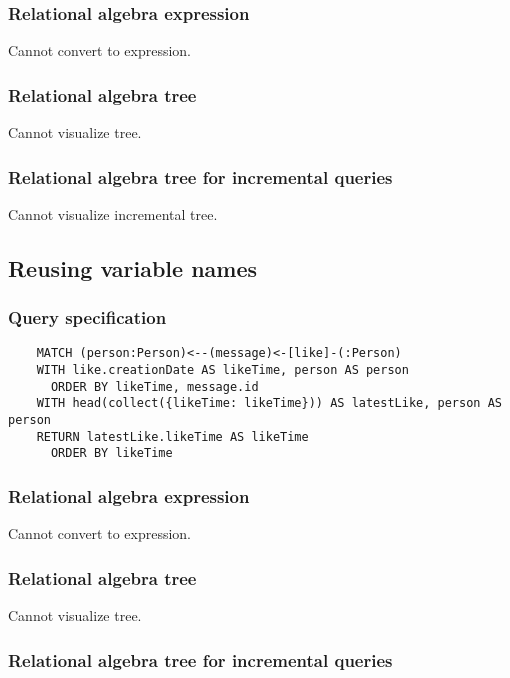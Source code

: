 	\subsubsection*{Relational algebra expression}

	Cannot convert to expression.

	\subsubsection*{Relational algebra tree}

	Cannot visualize tree.

	\subsubsection*{Relational algebra tree for incremental queries}

	Cannot visualize incremental tree.
	\subsection{Reusing variable names}

	\subsubsection*{Query specification}

	\begin{lstlisting}
	MATCH (person:Person)<--(message)<-[like]-(:Person)
	WITH like.creationDate AS likeTime, person AS person
	  ORDER BY likeTime, message.id
	WITH head(collect({likeTime: likeTime})) AS latestLike, person AS person
	RETURN latestLike.likeTime AS likeTime
	  ORDER BY likeTime
	\end{lstlisting}


	\subsubsection*{Relational algebra expression}

	Cannot convert to expression.

	\subsubsection*{Relational algebra tree}

	Cannot visualize tree.

	\subsubsection*{Relational algebra tree for incremental queries}

